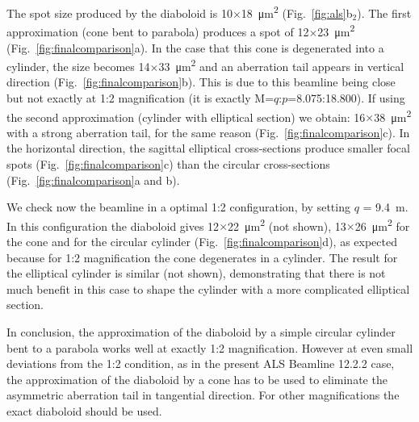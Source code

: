 \documentclass{iucr}       %
\begin{document}
The spot size produced by the diaboloid is 10$\times$\SI{18}{\micro\meter^2} (Fig.~\ref{fig:als}b$_2$). The first approximation (cone bent to parabola) produces a spot of 12$\times$\SI{23}{\micro\meter^2} (Fig.~\ref{fig:finalcomparison}a). In the case that this cone is degenerated into a cylinder, the size becomes 14$\times$\SI{33}{\micro\meter^2} and an aberration tail appears in vertical direction (Fig.~\ref{fig:finalcomparison}b). This is due to this beamline being close but not exactly at 1:2 magnification (it is exactly M=$q$:$p$=8.075:18.800). If using the second approximation (cylinder with elliptical section) we obtain: 16$\times$\SI{38}{\micro\meter^2} with a strong aberration tail, for the same reason (Fig.~\ref{fig:finalcomparison}c). In the horizontal direction, the sagittal elliptical cross-sections produce smaller focal spots (Fig.~\ref{fig:finalcomparison}c) than the circular cross-sections (Fig.~\ref{fig:finalcomparison}a and b).

We check now the beamline in a optimal 1:2 configuration, by setting $q$ = \SI{9.4}{\meter}. In this configuration the diaboloid gives 12$\times$\SI{22}{\micro\meter^2} (not shown), 13$\times$\SI{26}{\micro\meter^2} for the cone and for the circular cylinder (Fig.~\ref{fig:finalcomparison}d), as expected because for 1:2 magnification the cone degenerates in a cylinder. The result for the elliptical cylinder is similar (not shown), demonstrating that there is not much benefit in this case to shape the cylinder with a more complicated elliptical section.  

In conclusion, the approximation of the diaboloid by a simple circular cylinder bent to a parabola works well at exactly 1:2 magnification. However at even small deviations from the 1:2 condition, as in the present ALS Beamline 12.2.2 case, the approximation of the diaboloid by a cone has to be used to eliminate the asymmetric aberration tail in tangential direction. For other magnifications the exact diaboloid should be used.
\end{document}
